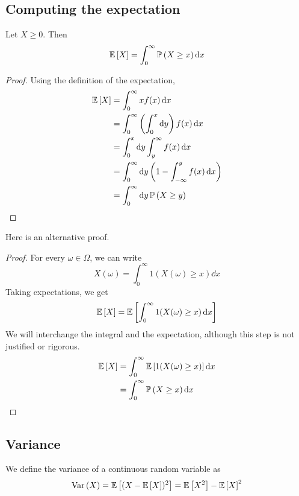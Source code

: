 \subsection{Computing the expectation}
\begin{claim}
	Let \(X \geq 0\).
	Then
	\[
		\mathbb{E}\left[{X}\right] = \int_0^\infty \mathbb{P}\left({X \geq x}\right) \dd{x}
	\]
\end{claim}
\begin{proof}
	Using the definition of the expectation,
	\begin{align*}
		\mathbb{E}\left[{X}\right] & = \int_0^\infty xf(x) \dd{x}                                           \\
		           & = \int_0^\infty \left( \int_0^x \dd{y} \right) f(x) \dd{x}             \\
		           & = \int_0^x \dd{y} \int_y^\infty f(x) \dd{x}                            \\
		           & = \int_0^\infty \dd{y} \left( 1 - \int_{-\infty}^y f(x) \dd{x} \right) \\
		           & = \int_0^\infty \dd{y} \mathbb{P}\left({X \geq y}\right)
	\end{align*}
\end{proof}
\noindent Here is an alternative proof.
\begin{proof}
	For every \(\omega \in \Omega\), we can write
	\[
		X(\omega) = \int_0^\infty 1(X(\omega) \geq x) \dd{x}
	\]
	Taking expectations, we get
	\[
		\mathbb{E}\left[{X}\right] = \mathbb{E}\left[{\int_0^\infty 1(X(\omega) \geq x) \dd{x}}\right]
	\]
	We will interchange the integral and the expectation, although this step is not justified or rigorous.
	\begin{align*}
		\mathbb{E}\left[{X}\right] & = \int_0^\infty \mathbb{E}\left[{1(X(\omega) \geq x)}\right] \dd{x} \\
		           & = \int_0^\infty \mathbb{P}\left({X \geq x}\right) \dd{x}
	\end{align*}
\end{proof}

\subsection{Variance}
We define the variance of a continuous random variable as
\[
	\operatorname{Var}\left({X}\right) = \mathbb{E}\left[{(X - \mathbb{E}\left[{X}\right])^2}\right] = \mathbb{E}\left[{X^2}\right] - \mathbb{E}\left[{X}\right]^2
\]

